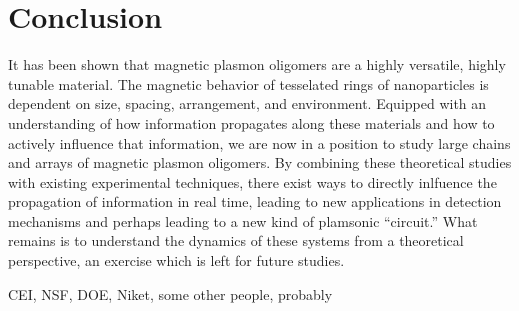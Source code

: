 \documentclass[journal=apchd5,manuscript=article]{achemso}
\begin{document}
\section{Conclusion}
It has been shown that magnetic plasmon oligomers are a highly versatile, highly tunable material. The magnetic behavior of tesselated rings of nanoparticles is dependent on size, spacing, arrangement, and environment. Equipped with an understanding of how information propagates along these materials and how to actively influence that information, we are now in a position to study large chains and arrays of magnetic plasmon oligomers. By combining these theoretical studies with existing experimental techniques, there exist ways to directly inlfuence the propagation of information in real time, leading to new applications in detection mechanisms and perhaps leading to a new kind of plamsonic ``circuit.'' What remains is to understand the dynamics of these systems from a theoretical perspective, an exercise which is left for future studies.

\begin{acknowledgement}
CEI, NSF, DOE, Niket, some other people, probably
\end{acknowledgement}


\end{document}
